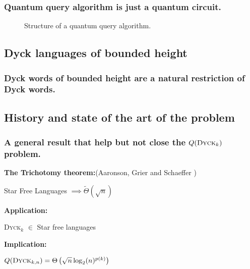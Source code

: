 \documentclass[9pt, notheorems]{beamer}
\newcommand{\Dyck}[1]{\textsc{Dyck$_{#1}$}}
\renewcommand{\comment}[1]{}
\theoremstyle{definition}
\theoremstyle{plain}
\theoremstyle{definition}
\begin{document}
\begin{frame}
    \frametitle{Quantum query algorithm is just a quantum circuit.}
    \begin{figure}
        \centering

        
        \caption{Structure of a quantum query algorithm.}
        \label{fig:quantum_query_algorithm_structure}
    \end{figure}
\end{frame}

\subsection{Dyck languages of bounded height}

\begin{frame}
    \frametitle{Dyck words of bounded height are a natural restriction of Dyck words.}
    \begin{figure}
        
    \end{figure}
    \visible<10>{
        {\Huge \[\Dyck{k}\]}}
\end{frame}

\subsection{History and state of the art of the problem}

\begin{frame}
    \frametitle{A general result that help but not close the $Q(\Dyck{k})$ problem.}
    \vfill
    \textbf{The Trichotomy theorem:}(Aaronson,
    Grier and Schaeffer \cite[2019]{trichotomy_not_andris})
    \begin{center}
        {\huge Star Free Languages $\implies \tilde{\Theta}\left(\sqrt{n}\right)$ }\\
    \end{center}
    \vfill
    \pause
    \textbf{Application:}
    \begin{center}
        {\huge \Dyck{k} $\in$ Star free languages}
    \end{center}
    \pause
    \vfill
    \textbf{Implication:}
    \begin{center}
        {\huge $\comment{\exists p, }Q(\Dyck{k,n})=\Theta \left(\sqrt{n}\log_2(n)^{p(k)}\right)$}
    \end{center}
    \vfill
\end{frame}
\end{document}
